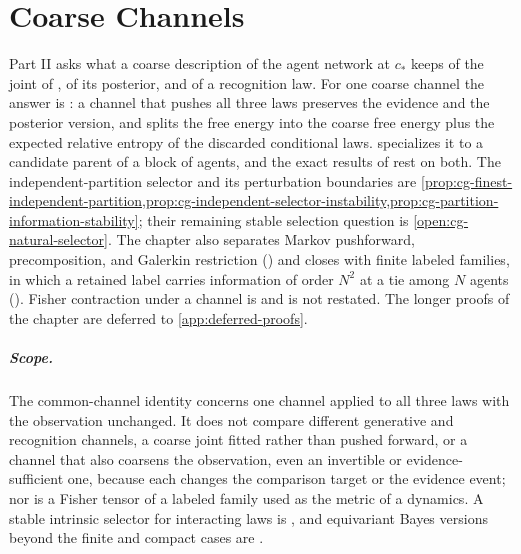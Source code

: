 \chapter{Coarse Channels}
\label{ch:coarsegraining}

Part II asks what a coarse description of the agent network at $c_*$ keeps of the joint of
, of its posterior, and of a recognition law. For one coarse channel the answer
is : a channel that pushes all three laws preserves the evidence and
the posterior version, and splits the free energy into the coarse free energy plus the expected
relative entropy of the discarded conditional laws. 
specializes it to a candidate parent of a block of agents, and the exact results of
rest on both. The independent-partition selector and its perturbation boundaries are
\cref{prop:cg-finest-independent-partition,prop:cg-independent-selector-instability,prop:cg-partition-information-stability}; their remaining stable selection question is
\cref{open:cg-natural-selector}. The chapter also separates Markov pushforward, precomposition, and Galerkin
restriction () and closes with finite labeled families, in which a
retained label carries information of order $N^2$ at a tie among $N$ agents
(). Fisher contraction under a channel is
 and is not restated. The longer proofs of the chapter are
deferred to \cref{app:deferred-proofs}.

\paragraph{Scope.} The common-channel identity concerns one channel applied to all three laws with
the observation unchanged. It does not compare different generative and recognition channels, a
coarse joint fitted rather than pushed forward, or a channel that also coarsens the observation, even
an invertible or evidence-sufficient one, because each changes the comparison target or the evidence
event; nor is a Fisher tensor of a labeled family used as the metric of a dynamics.
 A stable intrinsic selector for interacting laws is
, and equivariant Bayes versions beyond the finite and compact cases
are .

